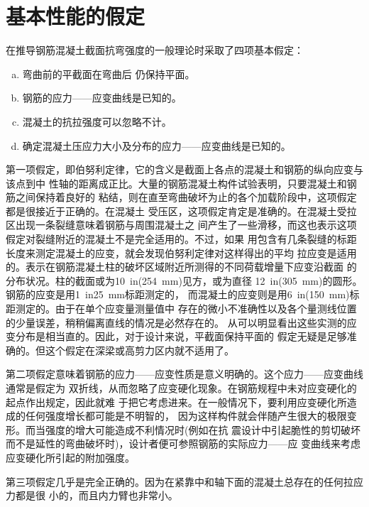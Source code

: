 \documentclass[12pt,a4paper]{book}
\begin{document}
\section{基本性能的假定}

在推导钢筋混凝土截面抗弯强度的一般理论时采取了四项基本假定：
\begin{enumerate}[a.]
\item 弯曲前的平截面在弯曲后 仍保持平面。
\item 钢筋的应力——应变曲线是已知的。
\item 混凝土的抗拉强度可以忽略不计。
\item 确定混凝土压应力大小及分布的应力——应变曲线是已知的。
\end{enumerate}

第一项假定，即伯努利定律，它的含义是截面上各点的混凝土和钢筋的纵向应变与该点到中
性轴的距离成正比。大量的钢筋混凝土构件试验表明，只要混凝土和钢筋之间保持着良好的
粘结，则在直至弯曲破坏为止的各个加载阶段中，这项假定都是很接近于正确的。在混凝土
受压区，这项假定肯定是准确的。在混凝土受拉区出现一条裂缝意味着钢筋与周围混凝土之
间产生了一些滑移，而这也表示这项假定对裂缝附近的混凝土不是完全适用的。不过，如果
用包含有几条裂缝的标距长度来测定混凝土的应变，就会发现伯努利定律对这样得出的平均
拉应变是适用的。表示在钢筋混凝土柱的破坏区域附近所测得的不同荷载增量下应变沿截面
的分布状况。柱的截面或为\SI{10}{in}(\SI{254}{mm})见方，或为直径
\SI{12}{in}(\SI{305}{mm})的圆形。钢筋的应变是用\SI{1}{in}{\SI{25}{mm}}标距测定的，
而混凝土的应变则是用\SI{6}{in}(\SI{150}{mm})标距测定的。由于在单个应变量测量值中
存在的微小不准确性以及各个量测线位置的少量误差，稍稍偏离直线的情况是必然存在的。
从可以明显看出这些实测的应变分布是相当直的。因此，对于设计来说，平截面保持平面的
假定无疑是足够准确的。但这个假定在深梁或高剪力区内就不适用了。

第二项假定意味着钢筋的应力——应变性质是意义明确的。这个应力——应变曲线通常是假定为
双折线，从而忽略了应变硬化现象。在钢筋规程中未对应变硬化的起点作出规定，因此就难
于把它考虑进来。在一般情况下，要利用应变硬化所造成的任何强度增长都可能是不明智的，
因为这样构件就会伴随产生很大的极限变形。而当强度的增大可能造成不利情况时(例如在抗
震设计中引起脆性的剪切破坏而不是延性的弯曲破坏时)，设计者便可参照钢筋的实际应力——应
变曲线来考虑应变硬化所引起的附加强度。

第三项假定几乎是完全正确的。因为在紧靠中和轴下面的混凝土总存在的任何拉应力都是很
小的，而且内力臂也非常小。
\end{document}
